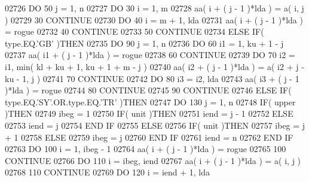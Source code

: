 \begin{DoxyCode}
02726          \textcolor{keywordflow}{DO} 50 j = 1, n
02727             \textcolor{keywordflow}{DO} 30 i = 1, m
02728                aa( i + ( j - 1 )*lda ) = a( i, j )
02729    30       \textcolor{keywordflow}{CONTINUE}
02730             \textcolor{keywordflow}{DO} 40 i = m + 1, lda
02731                aa( i + ( j - 1 )*lda ) = rogue
02732    40       \textcolor{keywordflow}{CONTINUE}
02733    50    \textcolor{keywordflow}{CONTINUE}
02734       \textcolor{keywordflow}{ELSE} \textcolor{keywordflow}{IF}( type.EQ.\textcolor{stringliteral}{'GB'} )\textcolor{keywordflow}{THEN}
02735          \textcolor{keywordflow}{DO} 90 j = 1, n
02736             \textcolor{keywordflow}{DO} 60 i1 = 1, ku + 1 - j
02737                aa( i1 + ( j - 1 )*lda ) = rogue
02738    60       \textcolor{keywordflow}{CONTINUE}
02739             \textcolor{keywordflow}{DO} 70 i2 = i1, min( kl + ku + 1, ku + 1 + m - j )
02740                aa( i2 + ( j - 1 )*lda ) = a( i2 + j - ku - 1, j )
02741    70       \textcolor{keywordflow}{CONTINUE}
02742             \textcolor{keywordflow}{DO} 80 i3 = i2, lda
02743                aa( i3 + ( j - 1 )*lda ) = rogue
02744    80       \textcolor{keywordflow}{CONTINUE}
02745    90    \textcolor{keywordflow}{CONTINUE}
02746       \textcolor{keywordflow}{ELSE} \textcolor{keywordflow}{IF}( type.EQ.\textcolor{stringliteral}{'SY'}.OR.type.EQ.\textcolor{stringliteral}{'TR'} )\textcolor{keywordflow}{THEN}
02747          \textcolor{keywordflow}{DO} 130 j = 1, n
02748             \textcolor{keywordflow}{IF}( upper )\textcolor{keywordflow}{THEN}
02749                ibeg = 1
02750                \textcolor{keywordflow}{IF}( unit )\textcolor{keywordflow}{THEN}
02751                   iend = j - 1
02752                \textcolor{keywordflow}{ELSE}
02753                   iend = j
02754 \textcolor{keywordflow}{               END IF}
02755             \textcolor{keywordflow}{ELSE}
02756                \textcolor{keywordflow}{IF}( unit )\textcolor{keywordflow}{THEN}
02757                   ibeg = j + 1
02758                \textcolor{keywordflow}{ELSE}
02759                   ibeg = j
02760 \textcolor{keywordflow}{               END IF}
02761                iend = n
02762 \textcolor{keywordflow}{            END IF}
02763             \textcolor{keywordflow}{DO} 100 i = 1, ibeg - 1
02764                aa( i + ( j - 1 )*lda ) = rogue
02765   100       \textcolor{keywordflow}{CONTINUE}
02766             \textcolor{keywordflow}{DO} 110 i = ibeg, iend
02767                aa( i + ( j - 1 )*lda ) = a( i, j )
02768   110       \textcolor{keywordflow}{CONTINUE}
02769             \textcolor{keywordflow}{DO} 120 i = iend + 1, lda

\end{DoxyCode}
